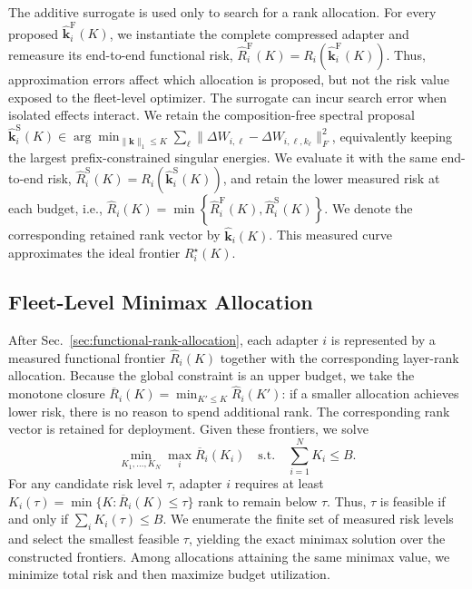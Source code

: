 \documentclass{article}
\begin{document}
The additive surrogate is used only to search for a rank allocation. For
every proposed $\widehat{\mathbf{k}}_i^{\mathrm F}(K)$, we instantiate the
complete compressed adapter and remeasure its end-to-end functional risk,
$
  \widehat R_i^{\mathrm F}(K)
  =R_i\!\left(\widehat{\mathbf{k}}_i^{\mathrm F}(K)\right).
  \label{eq:functional-verification}
$
Thus, approximation errors affect which allocation is proposed, but not the
risk value exposed to the fleet-level optimizer. %
The surrogate can incur search error when isolated effects interact. We retain
the composition-free spectral proposal
$\widehat{\mathbf{k}}_i^{\mathrm S}(K)\in\arg\min_{\|\mathbf{k}\|_1\le K}
\sum_\ell\|\Delta W_{i,\ell}-\Delta W_{i,\ell,k_\ell}\|_F^2$, equivalently
keeping the largest prefix-constrained singular energies. We evaluate it with the
same end-to-end risk,
$\widehat R_i^{\mathrm S}(K)=
R_i(\widehat{\mathbf{k}}_i^{\mathrm S}(K))$, and retain the lower measured risk
at each budget, i.e.,
$  \widehat R_i(K)
  =\min\!\left\{
    \widehat R_i^{\mathrm F}(K),
    \widehat R_i^{\mathrm S}(K)
  \right\}.
  \label{eq:robust-frontier}
$
We denote the corresponding retained rank vector by
$\widehat{\mathbf{k}}_i(K)$. This measured curve approximates the ideal
frontier $R_i^\star(K)$.

\subsection{Fleet-Level Minimax Allocation}
\label{sec:fleet-minimax-allocation}

After Sec.~\ref{sec:functional-rank-allocation}, each adapter $i$ is represented
by a measured functional frontier $\widehat R_i(K)$ together with the
corresponding layer-rank allocation. Because the global constraint is an upper
budget, we take the monotone closure
$\overline R_i(K)=\min_{K'\le K}\widehat R_i(K')$: if a smaller allocation
achieves lower risk, there is no reason to spend additional rank. The
corresponding rank vector is retained for deployment. Given these frontiers, we solve
\begin{equation}
  \min_{K_1,\ldots,K_N}\max_i\overline R_i(K_i)
  \quad\mathrm{s.t.}\quad \sum_{i=1}^N K_i\le B.
  \label{eq:fleet-minimax}
\end{equation}
For any candidate risk level $\tau$, adapter $i$ requires at least
$K_i(\tau)=\min\{K:\overline R_i(K)\le\tau\}$ rank to remain below $\tau$.
Thus, $\tau$ is feasible if and only if $\sum_i K_i(\tau)\le B$. We enumerate
the finite set of measured risk levels and select the smallest feasible
$\tau$, yielding the exact minimax solution over the constructed frontiers. Among allocations attaining the same minimax value, we minimize total risk and
then maximize budget utilization.
\end{document}
